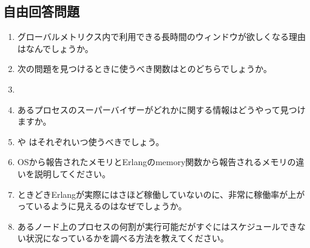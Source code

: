 \subsection*{自由回答問題}

\begin{enumerate}
  \item グローバルメトリクス内で利用できる長時間のウィンドウが欲しくなる理由はなんでしょうか。
  \item 次の問題を見つけるときに使うべき関数はとのどちらでしょうか。
  \item
  \item あるプロセスのスーパーバイザーがどれかに関する情報はどうやって見つけますか。  
  \item  {} や  はそれぞれいつ使うべきでしょう。
  \item OSから報告されたメモリとErlangのmemory関数から報告されるメモリの違いを説明してください。
  \item ときどきErlangが実際にはさほど稼働していないのに、非常に稼働率が上がっているように見えるのはなぜでしょうか。
  \item あるノード上のプロセスの何割が実行可能だがすぐにはスケジュールできない状況になっているかを調べる方法を教えてください。
\end{enumerate}

